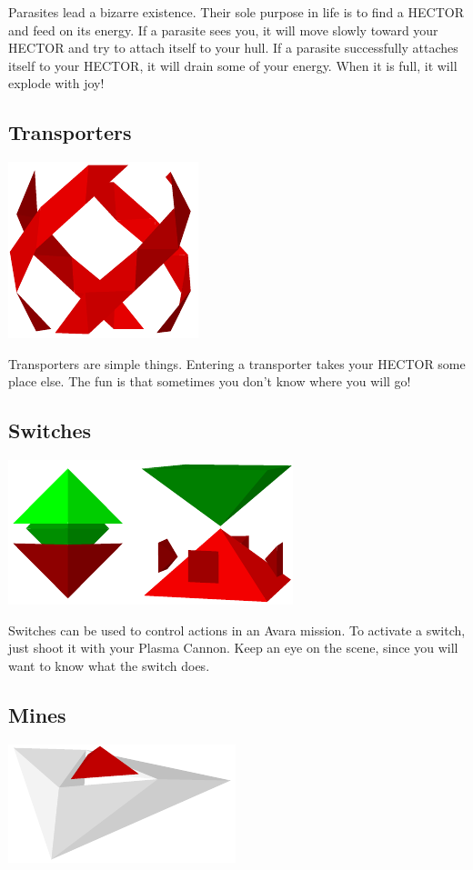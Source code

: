 \documentclass{article}
\begin{document}
Parasites lead a bizarre existence. Their sole purpose in life is to find a HECTOR and feed on its energy. If a parasite sees you, it will move slowly toward your HECTOR and try to attach itself to your hull. If a parasite successfully attaches itself to your HECTOR, it will drain some of your energy. When it is full, it will explode with joy!

\subsection{Transporters}
\begin{center}
	\includegraphics{img/15.pdf}
\end{center}

Transporters are simple things. Entering a transporter takes your HECTOR some place else. The fun is that sometimes you don't know where you will go!

\subsection{Switches}
\begin{center}
	\includegraphics{img/16.pdf}
\end{center}

Switches can be used to control actions in an Avara mission. To activate a switch, just shoot it with your Plasma Cannon. Keep an eye on the scene, since you will want to know what the switch does.

\subsection{Mines}
\begin{center}
	\includegraphics{img/17.pdf}
\end{center}
\end{document}
